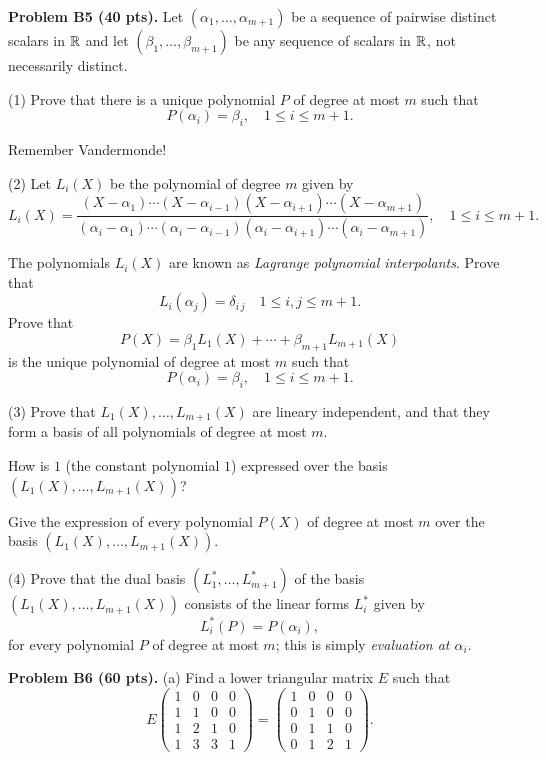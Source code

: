 \documentclass[12pt]{article}
\begin{document}
\vspace {0.25cm}\noindent
{\bf Problem B5 (40 pts).}
Let $(\alpha_1, \ldots, \alpha_{m + 1})$ be a sequence of pairwise distinct
scalars in ${\mathbb R}$ and let $(\beta_1, \ldots, \beta_{m + 1})$ be any 
sequence of scalars in ${\mathbb R}$, not necessarily distinct.

\medskip
(1)
Prove that there is a unique polynomial $P$ of degree at most $m$
such that
\[
P(\alpha_i) = \beta_i, \quad 1\leq i \leq m + 1. 
\]

\medskip
\hint
Remember Vandermonde!

\medskip
(2)
Let $L_i(X)$ be the polynomial of degree $m$ given by
\[
L_i(X) = \frac{(X - \alpha_1)\cdots (X - \alpha_{i - 1}) (X - \alpha_{i + 1})
\cdots (X - \alpha_{m + 1})}
  {(\alpha_i - \alpha_1)\cdots (\alpha_i - \alpha_{i - 1}) 
(\alpha_i - \alpha_{i + 1}) \cdots (\alpha_i - \alpha_{m + 1})},
\quad 1 \leq i \leq m + 1.
\]

The polynomials $L_i(X)$ are known as 
{\it Lagrange polynomial interpolants\/}.
Prove that
\[
L_i(\alpha_j) = \delta_{i\, j} \quad 1\leq i, j \leq m + 1.
\]
Prove that
\[
P(X) = \beta_1L_1(X) + \cdots + \beta_{m + 1} L_{m + 1}(X)
\]
is the unique polynomial of degree at most $m$ such that
\[
P(\alpha_i) = \beta_i, \quad 1\leq i \leq m + 1. 
\]

\medskip
(3)
Prove that $L_1(X), \dots, L_{m + 1}(X)$ are lineary independent, and that
they form a basis of all polynomials of degree at most $m$.

\medskip
How is $1$ (the constant polynomial $1$)
expressed over the basis $(L_1(X), \dots, L_{m + 1}(X))$?

\medskip
Give the expression of every polynomial $P(X)$ of degree at most $m$ over
the basis $(L_1(X), \dots, L_{m + 1}(X))$.

\medskip
(4)
Prove that the dual basis $(L_1^*, \dots, L_{m + 1}^*)$
of the basis $(L_1(X), \dots, L_{m + 1}(X))$ consists of the linear forms
$L_i^*$ given by
\[
L_i^*(P) = P(\alpha_i),
\]
for every polynomial $P$ of degree at most $m$;
this is simply {\it evaluation at $\alpha_i$\/}.

\vspace {0.25cm}\noindent
{\bf Problem B6 (60 pts).}
(a)
Find a lower triangular matrix $E$ such that
\[
E 
\begin{pmatrix}
1 & 0 & 0 & 0 \\
1 & 1 & 0 & 0 \\
1 & 2 & 1 & 0 \\
1 & 3 & 3 & 1
\end{pmatrix}
=
\begin{pmatrix}
1 & 0 & 0 & 0 \\
0 & 1 & 0 & 0 \\
0 & 1 & 1 & 0 \\
0 & 1 & 2 & 1 
\end{pmatrix}.
\]
\end{document}
